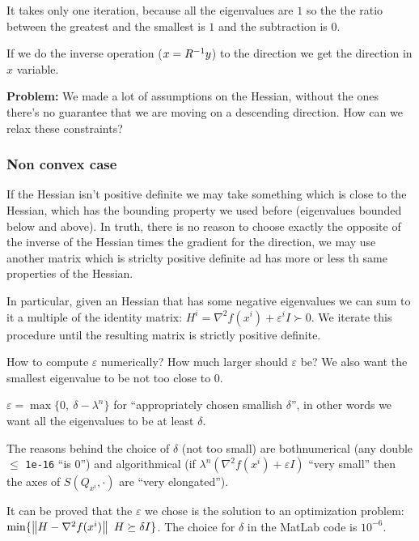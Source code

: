 \documentclass[computationalMathematics.tex]{subfiles}
\begin{document}
It takes only one iteration, because all the eigenvalues are $1$ so the the ratio between the greatest and the smallest is $1$ and the subtraction is $0$.

If we do the inverse operation ($x = {R}^{-1} y$) to the direction we get the direction in $x$ variable.

\begin{myframe}{\bf Problem:}
We made a lot of assumptions on the Hessian, without the ones there's no guarantee that we are moving on a descending direction. How can we relax these constraints?
\end{myframe}

\subsubsection{Non convex case}

If the Hessian isn't positive definite we may take something which is close to the Hessian, which has the bounding property we used before (eigenvalues bounded below and above). In truth, there is no reason to choose exactly the opposite of the inverse of the Hessian times the gradient for the direction, we may use another matrix which is striclty positive definite ad has more or less th same properties of the Hessian.

In particular, given an Hessian that has some negative eigenvalues we can sum to it a multiple of the identity matrix: $H^i = \nabla^2 f(x^i) + \varepsilon^i I \succ 0$. We iterate this procedure until the resulting matrix is strictly positive definite.

How to compute $\varepsilon$ numerically? How much larger should $\varepsilon$ be? We also want the smallest eigenvalue to be not too close to $0$.

 $\varepsilon = \max \{0,~  \delta - \lambda^n\}$ for ``appropriately chosen smallish $\delta$'', in other words we want all the eigenvalues to be at least $\delta$.

 The reasons behind the choice of $\delta$ (not too small) are bothnumerical (any double $\leq$ {\tt 1e-16} ``is $0$'') and algorithmical (if $\lambda^n(\nabla^2 f(x^i) + \varepsilon I)$ ``very small'' then the axes of $S(Q_{x^i}, \cdot)$ are ``very elongated'').

 It can be proved that the $\varepsilon$ we chose is the solution to an optimization problem: $\min \{\left\lVert H - \nabla^2 f(x^i)\right\rVert ~ H \succeq \delta I\}$. The choice for $\delta$ in the MatLab code is $10^{-6}$.
\end{document}
